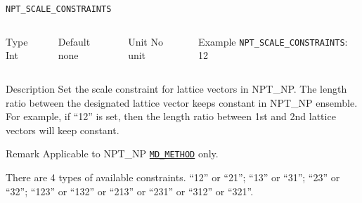 \begin{frame}[allowframebreaks]{\texttt{NPT\_SCALE\_CONSTRAINTS}} \label{NPT_SCALE_CONSTRAINTS}
\vspace*{-12pt}
\begin{columns}
\begin{block}{Type}
Int
\end{block}

\begin{block}{Default}
none
\end{block}

\begin{block}{Unit}
No unit
\end{block}

\begin{block}{Example}
\texttt{NPT\_SCALE\_CONSTRAINTS}: 12
\end{block}
\end{columns}

\begin{block}{Description}
Set the scale constraint for lattice vectors in NPT\_NP. The length ratio between the designated lattice vector keeps constant in NPT\_NP ensemble. For example, if ``12'' is set, then the length ratio between 1st and 2nd lattice vectors will keep constant.
\end{block}

\begin{block}{Remark}
Applicable to NPT\_NP \hyperlink{MD_METHOD}{\texttt{MD\_METHOD}} only.

There are 4 types of available constraints. ``12'' or ``21''; ``13'' or ``31''; ``23'' or ``32''; ``123'' or ``132'' or ``213'' or ``231'' or ``312'' or ``321''.
\end{block}

\end{frame}



